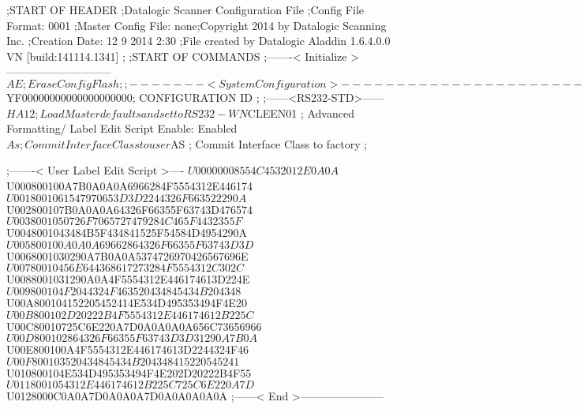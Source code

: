 ;START OF HEADER
;Datalogic Scanner Configuration File
;Config File Format: 0001
;Master Config File: none;Copyright 2014 by Datalogic Scanning Inc.
;Creation Date: 12 9 2014 2:30
;File created by Datalogic Aladdin 1.6.4.0.0 VN [build:141114.1341]
;
;START OF COMMANDS
;-------< Initialize >-----------------------------
$AE                 ; Erase Config Flash
;
;-------< System Configuration >-------------------------------
$YF00000000000000000000; CONFIGURATION ID
;
;------<RS232-STD>------
$HA12               ; Load Master defaults and set to RS232-WN
$CLEEN01            ; Advanced Formatting/ Label Edit Script Enable: Enabled
$As                 ; Commit Interface Class to user
$AS                 ; Commit Interface Class to factory
;

;-------< User Label Edit Script >----
$U00000008554C4532012E0A0A
$U000800100A7B0A0A0A6966284F5554312E446174
$U0018001061547970653D3D2244326F663522290A
$U002800107B0A0A0A64326F66355F63743D476574
$U0038001050726F7065727479284C465F4432355F
$U0048001043484B5F434841525F54584D4954290A
$U005800100A0A0A69662864326F66355F63743D3D
$U0068001030290A7B0A0A5374726970426567696E
$U00780010456E644368617273284F5554312C302C
$U0088001031290A0A4F5554312E446174613D224E
$U009800104F2044324F463520434845434B204348
$U00A800104152205452414E534D495353494F4E20
$U00B800102D20222B4F5554312E446174612B225C
$U00C80010725C6E220A7D0A0A0A0A656C73656966
$U00D800102864326F66355F63743D3D31290A7B0A
$U00E800100A4F5554312E446174613D2244324F46
$U00F800103520434845434B204348415220545241
$U010800104E534D495353494F4E202D20222B4F55
$U0118001054312E446174612B225C725C6E220A7D
$U0128000C0A0A7D0A0A0A7D0A0A0A0A0A
;------< End >-----------------------
